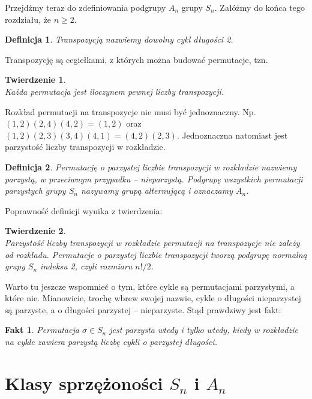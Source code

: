 \documentclass[licencjacka]{pracamgr}
\newtheorem{deff}{Definicja}[section]
\newtheorem{thh}{Twierdzenie}[section]
\newtheorem{fact}{Fakt}[section]
\begin{document}
\pagebreak[2]

Przejdźmy teraz do zdefiniowania podgrupy $A_n$ grupy $S_n$.
Załóżmy do końca tego rozdziału, że $n \ge 2$.

\begin{deff}
	\emph{Transpozycją} nazwiemy dowolny cykl długości 2.
\end{deff}

Transpozycję są cegiełkami, z których można budować permutacje, tzn.

\begin{thh} $ $ \\
	Każda permutacja jest iloczynem pewnej liczby transpozycji.
\end{thh}

Rozkład permutacji na transpozycje nie musi być jednoznaczny.
Np. $(1, 2) (2, 4) (4, 2) = (1, 2)$ oraz $(1, 2) (2, 3) (3, 4) (4, 1) = (4, 2) (2, 3)$.
Jednoznaczna natomiast jest parzystość liczby transpozycji w rozkładzie.

\begin{deff}
	Permutację o parzystej liczbie transpozycji w rozkładzie nazwiemy \emph{parzystą}, 
	w przeciwnym przypadku -- \emph{nieparzystą}.
	Podgrupę wszystkich permutacji parzystych grupy $S_n$ nazywamy \emph{grupą alternującą} i oznaczamy $A_n$.
\end{deff}


Poprawność definicji wynika z twierdzenia:

\begin{thh}\label{thm_A_n} $ $ \\
	Parzystość liczby transpozycji w rozkładzie permutacji na transpozycje nie zależy od rozkładu.
	Permutacje o parzystej liczbie transpozycji tworzą podgrupę normalną grupy $S_n$ indeksu 2, czyli rozmiaru $n!/2$.
\end{thh}

Warto tu jeszcze wspomnieć o tym, które cykle są permutacjami parzystymi, a które nie.
Mianowicie, trochę wbrew swojej nazwie, cykle o długości nieparzystej są parzyste, 
a o długości parzystej -- nieparzyste.
Stąd prawdziwy jest fakt:

\begin{fact}\label{fact_typ_A_n}
	Permutacja $\sigma \in S_n$ jest parzysta wtedy i tylko wtedy, kiedy w rozkładzie na cykle 
	zawiera parzystą liczbę cykli o parzystej długości.
\end{fact}


\section{Klasy sprzężoności $S_n$ i $A_n$}
\end{document}
